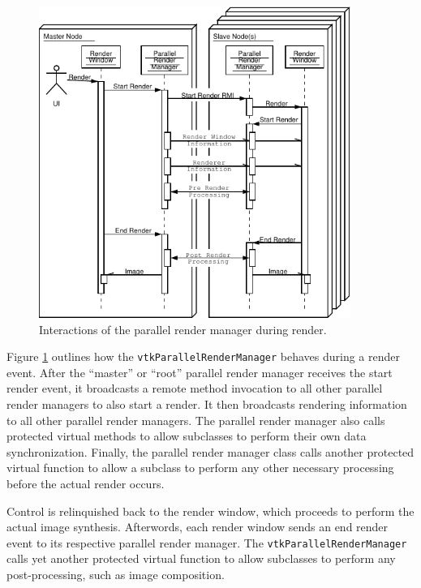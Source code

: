 \documentclass{acmsiggraph}
\newcommand{\cidentifier}[1]{\texttt{#1}}
\begin{document}
  \begin{figure}
    \begin{center}
      \includegraphics[width=4in]
		      {images/ParallelRenderManagerInteraction}
    \end{center}
    \caption{Interactions of the parallel render manager during render.}
    \label{fig:parallel_render_manager_interaction}
  \end{figure}
  Figure \ref{fig:parallel_render_manager_interaction} outlines how the
  \cidentifier{vtk\-Parallel\-Render\-Manager} behaves during a render
  event.  After the ``master'' or ``root'' parallel render manager receives
  the start render event, it broadcasts a remote method invocation to all
  other parallel render managers to also start a render.  It then
  broadcasts rendering information to all other parallel render managers.
  The parallel render manager also calls protected virtual methods to allow
  subclasses to perform their own data synchronization.  Finally, the
  parallel render manager class calls another protected virtual function to
  allow a subclass to perform any other necessary processing before the
  actual render occurs.

  Control is relinquished back to the render window, which proceeds to
  perform the actual image synthesis.  Afterwords, each render window sends
  an end render event to its respective parallel render manager.  The
  \cidentifier{vtk\-Parallel\-Render\-Manager} calls yet another protected
  virtual function to allow subclasses to perform any post-processing, such
  as image composition.
\end{document}

